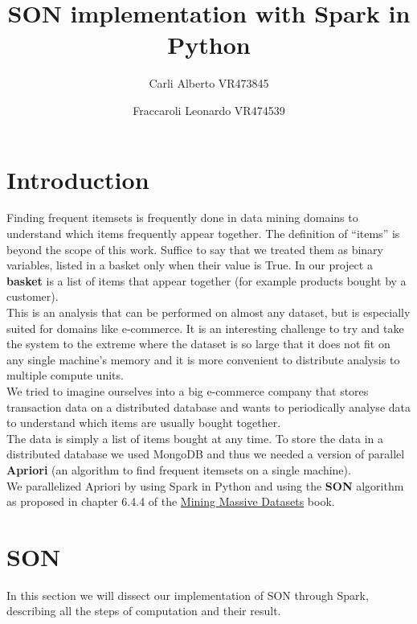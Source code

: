 \documentclass[a4paper]{article}
\title{SON implementation with Spark in Python}
\author{Carli Alberto VR473845\and Fraccaroli Leonardo VR474539}
\date{}
\begin{document}
	\maketitle
	\tableofcontents
	\newpage
	\section{Introduction}
	Finding frequent itemsets is frequently done in data mining domains to understand which items frequently appear together. The definition of ``items'' is beyond the scope of this work. Suffice to say that we treated them as binary variables, listed in a basket only when their value is True. In our project a \textbf{basket} is a list of items that appear together (for example products bought by a customer).\\
	
	This is an analysis that can be performed on almost any dataset, but is especially suited for domains like e-commerce. It is an interesting challenge to try and take the system to the extreme where the dataset is so large that it does not fit on any single machine's memory and it is more convenient to distribute analysis to multiple compute units.\\
	
	We tried to imagine ourselves into a big e-commerce company that stores transaction data on a distributed database and wants to periodically analyse data to understand which items are usually bought together. \\
	The data is simply a list of items bought at any time. To store the data in a distributed database we used MongoDB and thus we needed a version of parallel \textbf{Apriori} (an algorithm to find frequent itemsets on a single machine). \\
	We parallelized Apriori by using Spark in Python and using the \textbf{SON} algorithm as proposed in chapter 6.4.4 of the \href{http://www.mmds.org/}{Mining Massive Datasets} book.
	\newpage

	\section{SON}
	In this section we will dissect our implementation of SON through Spark, describing all the steps of computation and their result.\\
	
\end{document}
